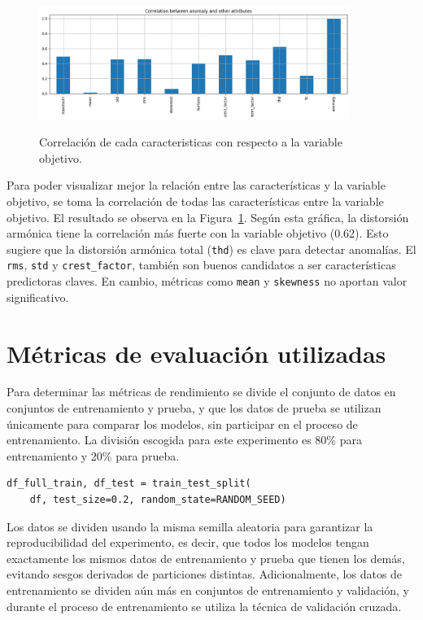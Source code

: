 \documentclass[11pt,a4paper,spanish]{book}
\numberwithin{equation}{chapter}
\numberwithin{figure}{chapter}
\begin{document}
\begin{figure}[h]
    \caption{Correlación de cada caracteristicas con respecto a la variable objetivo.}
    \centering
    \includegraphics[width=0.9\textwidth]{media/dataset-04/corr-mat-target.png}
    \label{fig:figMatrixCorrelationDT4TG}
\end{figure}


Para poder visualizar mejor la relación entre las características y la variable objetivo, se
toma la correlación de todas las características entre la variable objetivo. El resultado se 
observa en la Figura~\ref{fig:figMatrixCorrelationDT4TG}. Según esta gráfica, la distorsión
armónica tiene la correlación más fuerte con la variable objetivo (0.62). 
Esto sugiere que la distorsión armónica total (\texttt{thd}) es clave para detectar anomalías.
El \texttt{rms}, \texttt{std} y \texttt{crest\_factor}, 
también son buenos candidatos a ser características predictoras claves. 
En cambio, métricas como \texttt{mean} y \texttt{skewness} no aportan valor significativo.


\section{Métricas de evaluación utilizadas}


Para determinar las métricas de rendimiento se divide el conjunto de datos en conjuntos 
de entrenamiento y prueba, y que los datos de prueba se utilizan únicamente para 
comparar los modelos, sin participar en el proceso de entrenamiento. La división 
escogida para este experimento es 80\% para entrenamiento y 20\% para prueba. 


\vspace{5mm}
\begin{lstlisting}
df_full_train, df_test = train_test_split(
    df, test_size=0.2, random_state=RANDOM_SEED)
\end{lstlisting}


Los datos se dividen usando la misma semilla aleatoria para garantizar la 
reproducibilidad del experimento, es decir, que todos los modelos tengan exactamente 
los mismos datos de entrenamiento y prueba que tienen los demás, evitando sesgos 
derivados de particiones distintas. Adicionalmente, los datos de entrenamiento se 
dividen aún más en conjuntos de entrenamiento y validación, y durante el proceso de 
entrenamiento se utiliza la técnica de validación cruzada. 
\end{document}
